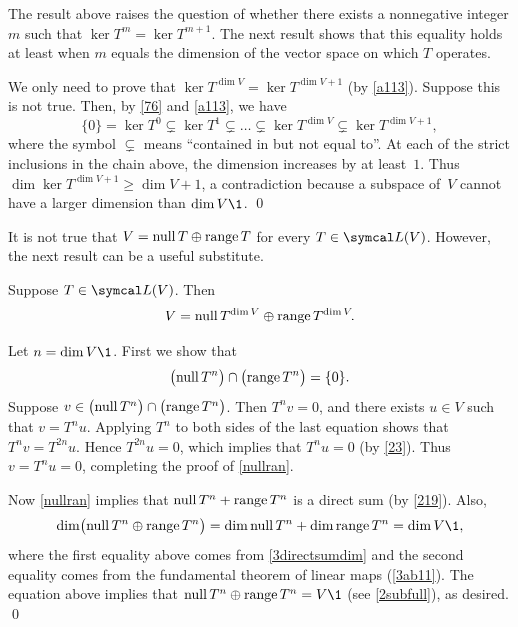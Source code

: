 The result above raises the question of whether there exists a
nonnegative integer $m$ such that $\ker T^m = \ker T^{m+1}\!$.  The
next result shows that this equality holds at least when $m$ equals the
dimension of the vector space on which $T$ operates.


\proof
We only need to prove that $\ker T^{\dim V} = \ker T^{\dim V + 1}$ (by
\ref{a113}).  Suppose this is not true.  Then, by \ref{76} and \ref{a113}, we have
\[
\{0\} = \ker T^0 \subsetneq \ker T^1 \subsetneq \dots
\subsetneq \ker T^{\dim V} \subsetneq \ker T^{\dim V + 1}\!,
\]
where the symbol $\subsetneq$ means ``contained in but not equal to''\!.
At each of the strict inclusions in the chain above, the dimension increases
by at least~$1$.  Thus $\dim \ker T^{\dim V + 1} \ge \dim V+ 1$, a contradiction
because a subspace of~$V$ cannot have a larger dimension than $\dim V\1$.
\qed

It is not true that $V = \ker T \oplus \ran T$ for every $T \in \L(V)$. However, the next result can be a useful substitute.

{
Suppose $T \in \L(V)$. Then
\[
V = \ker T^{\dim V} \oplus \ran T^{\dim V}\!.
\]
}

\proof
Let $n = \dim V\1$. First we show that
\begin{equation} \label{nullran}
\paren[\big]{\ker T^n} \cap \paren[\big]{\ran T^n} = \{0\}.
\end{equation}
Suppose $v \in \paren[\big]{\ker T^n} \cap \paren[\big]{\ran T^n}$. Then $T^n v = 0$, and there exists $u \in V$ such that $v = T^n u$. Applying $T^n$ to both sides of the last equation shows that $T^n v = T^{2n} u$. Hence $T^{2n} u = 0$, which implies that $T^n u = 0$ (by \ref{23}). Thus $v = T^n u = 0$, completing the proof of \ref{nullran}.

Now \ref{nullran} implies that $\ker T^n + \ran T^n$ is a direct sum (by \ref{219}). Also,
\[
\dim\paren[\big]{\ker T^n \oplus \ran T^n} = \dim \ker T^n + \dim \ran T^n = \dim V\1,
\]
where the first equality above comes from \ref{3directsumdim} and the second equality comes from the fundamental theorem of linear maps (\ref{3ab11}). The equation above implies that $\ker T^n \oplus \ran T^n = V\1$ (see \ref{2subfull}), as desired.
\qed

